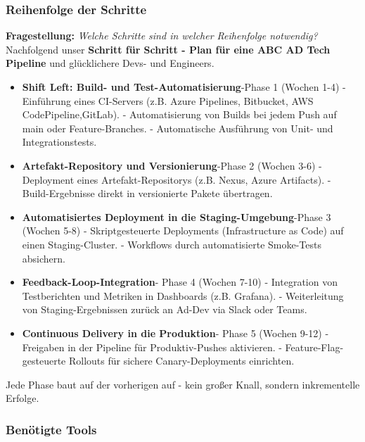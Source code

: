 \subsubsection{Reihenfolge der Schritte}
\textbf{Fragestellung:} \textit{Welche Schritte sind in welcher Reihenfolge notwendig?}
Nachfolgend unser \textbf{Schritt für Schritt - Plan für eine ABC AD Tech Pipeline} und glücklichere Devs- und Engineers. 
\begin{itemize}
    \item \textbf{Shift Left: Build- und Test-Automatisierung}-Phase 1 (Wochen 1-4)
    \subitem- Einführung eines CI-Servers (z.B. Azure Pipelines, Bitbucket, AWS CodePipeline,GitLab).
    \subitem- Automatisierung von Builds bei jedem Push auf main oder Feature-Branches.
    \subitem- Automatische Ausführung von Unit- und Integrationstests.
    \item \textbf{Artefakt-Repository und Versionierung}-Phase 2 (Wochen 3-6)
    \subitem- Deployment eines Artefakt-Repositorys (z.B. Nexus, Azure Artifacts).
    \subitem- Build-Ergebnisse direkt in versionierte Pakete übertragen.
    \item \textbf{Automatisiertes Deployment in die Staging-Umgebung}-Phase 3 (Wochen 5-8)
    \subitem- Skriptgesteuerte Deployments (Infrastructure as Code) auf einen Staging-Cluster.
    \subitem- Workflows durch automatisierte Smoke-Tests absichern.
    \item \textbf{Feedback-Loop-Integration}- Phase 4 (Wochen 7-10)
    \subitem- Integration von Testberichten und Metriken in Dashboards (z.B. Grafana).
    \subitem- Weiterleitung von Staging-Ergebnissen zurück an Ad-Dev via Slack oder Teams.
    \item \textbf{Continuous Delivery in die Produktion}- Phase 5 (Wochen 9-12)
    \subitem- Freigaben in der Pipeline für Produktiv-Pushes aktivieren.
    \subitem- Feature-Flag-gesteuerte Rollouts für sichere Canary-Deployments einrichten.
\end{itemize}
Jede Phase baut auf der vorherigen auf - kein großer Knall, sondern inkrementelle Erfolge.

\subsubsection{Benötigte Tools}


